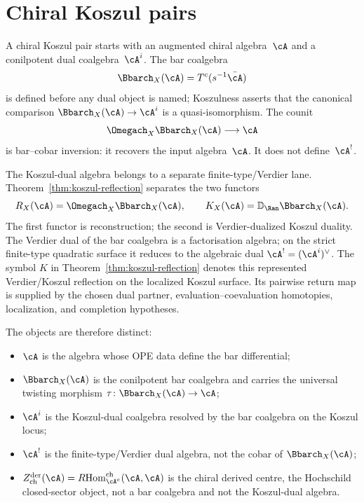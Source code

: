 
\chapter{Chiral Koszul pairs}
\label{chap:koszul-pair-structure}


\begin{remark}
\label{rem:koszul-pair-K-orbit}
A chiral Koszul pair starts with an augmented chiral algebra~$\cA$
and a conilpotent dual coalgebra~$\cA^i$.  The bar coalgebra
\[
 \Bbarch_X(\cA)=T^c(s^{-1}\bar\cA)
\]
is defined before any dual object is named; Koszulness asserts that
the canonical comparison $\Bbarch_X(\cA)\to\cA^i$ is a
quasi-isomorphism.  The counit
\[
 \Omegach_X\Bbarch_X(\cA)\longrightarrow \cA
\]
is bar--cobar inversion: it recovers the input algebra~$\cA$.  It
does not define~$\cA^!$.

The Koszul-dual algebra belongs to a separate finite-type/Verdier
lane.  Theorem~\textup{\ref{thm:koszul-reflection}} separates the two
functors
\[
 R_X(\cA)=\Omegach_X\Bbarch_X(\cA),\qquad
 K_X(\cA)=\mathbb{D}_{\Ran}\Bbarch_X(\cA).
\]
The first functor is reconstruction; the second is Verdier-dualized
Koszul duality. The Verdier dual of the bar coalgebra is a
factorisation algebra; on the strict finite-type quadratic surface it
reduces to the algebraic dual $\cA^!=(\cA^i)^\vee$.
The symbol $K$ in Theorem~\textup{\ref{thm:koszul-reflection}}
denotes this represented Verdier/Koszul reflection on the localized
Koszul surface.  Its pairwise return map is supplied by the chosen
dual partner, evaluation--coevaluation homotopies, localization, and
completion hypotheses.

The objects are therefore distinct:
\begin{itemize}
\item $\cA$ is the algebra whose OPE data define the bar differential;
\item $\Bbarch_X(\cA)$ is the conilpotent bar coalgebra and carries
 the universal twisting morphism $\tau\colon\Bbarch_X(\cA)\to\cA$;
\item $\cA^i$ is the Koszul-dual coalgebra resolved by the bar
 coalgebra on the Koszul locus;
\item $\cA^!$ is the finite-type/Verdier dual algebra, not the cobar
 of $\Bbarch_X(\cA)$;
\item $Z^{\mathrm{der}}_{\mathrm{ch}}(\cA)=
 R\!\operatorname{Hom}^{\mathrm{ch}}_{\cA^e}(\cA,\cA)$ is the chiral
 derived centre, the Hochschild closed-sector object, not a bar coalgebra and
 not the Koszul-dual algebra.
\end{itemize}
\end{remark}


